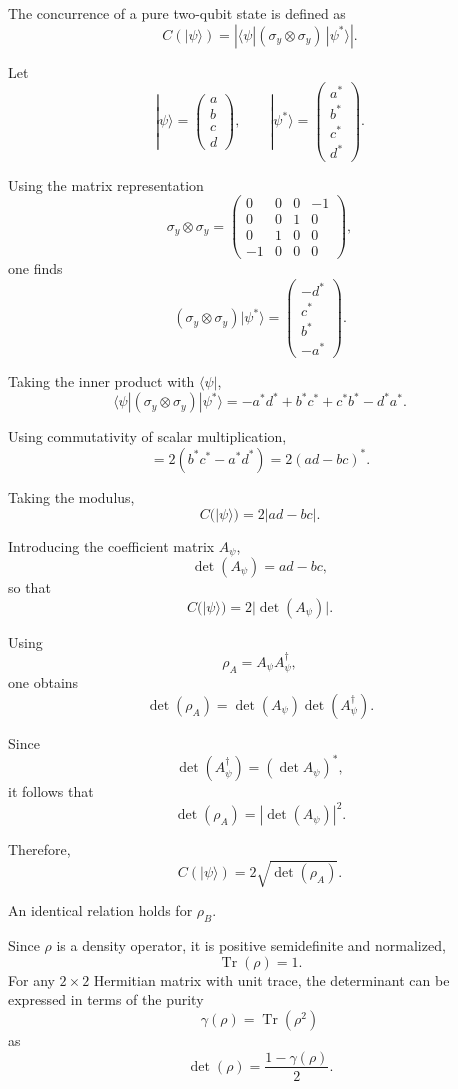 \documentclass[a4paper]{article}
\begin{document}
The concurrence of a pure two-qubit state is defined as
\[
C(|\psi\rangle)
=
\left|
\langle \psi | (\sigma_y \otimes \sigma_y)\,|\psi^*\rangle
\right|.
\]

Let
\[
|\psi\rangle =
\begin{pmatrix}
a\\
b\\
c\\
d
\end{pmatrix},
\qquad
|\psi^*\rangle =
\begin{pmatrix}
a^*\\
b^*\\
c^*\\
d^*
\end{pmatrix}.
\]

Using the matrix representation
\[
\sigma_y \otimes \sigma_y =
\begin{pmatrix}
0 & 0 & 0 & -1\\
0 & 0 & 1 & 0\\
0 & 1 & 0 & 0\\
-1 & 0 & 0 & 0
\end{pmatrix},
\]
one finds
\[
(\sigma_y \otimes \sigma_y)|\psi^*\rangle
=
\begin{pmatrix}
- d^*\\
c^*\\
b^*\\
- a^*
\end{pmatrix}.
\]

Taking the inner product with \(\langle \psi|\),
\[
\langle \psi | (\sigma_y \otimes \sigma_y)|\psi^*\rangle
=
- a^* d^* + b^* c^* + c^* b^* - d^* a^*.
\]

Using commutativity of scalar multiplication,
\[
=
2(b^*c^* - a^*d^*)
=
2(ad - bc)^*.
\]

Taking the modulus,
\[
C(|\psi\rangle)=2|ad-bc|.
\]

Introducing the coefficient matrix \(A_\psi\),
\[
\det(A_\psi) = ad - bc,
\]
so that
\[
C(|\psi\rangle)=2|\det(A_\psi)|.
\]


Using
\[
\rho_A = A_\psi A_\psi^\dagger,
\]
one obtains
\[
\det(\rho_A)
=
\det(A_\psi)\det(A_\psi^\dagger).
\]

Since
\[
\det(A_\psi^\dagger) = (\det A_\psi)^*,
\]
it follows that
\[
\det(\rho_A)=|\det(A_\psi)|^2.
\]

Therefore,
\[
C(|\psi\rangle)=2\sqrt{\det(\rho_A)}.
\]

An identical relation holds for \(\rho_B\).


Since $\rho$ is a density operator, it is positive semidefinite and normalized,
\[
\operatorname{Tr}(\rho) = 1.
\]
For any $2\times2$ Hermitian matrix with unit trace, the determinant can be expressed in terms of the purity
\[
\gamma(\rho) = \operatorname{Tr}(\rho^2)
\]
as
\[
\det(\rho)
=
\frac{1 - \gamma(\rho)}{2}.
\]
\end{document}
